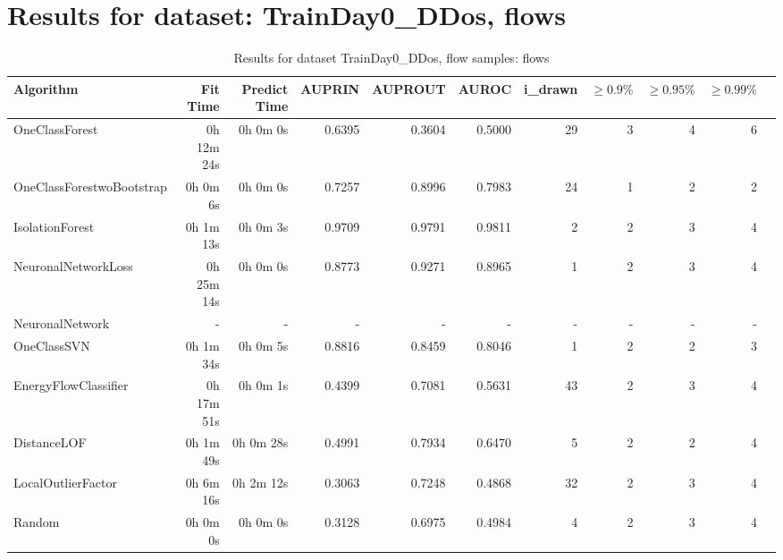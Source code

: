 \documentclass{article}
\begin{document}
\section*{Results for dataset: TrainDay0_DDos, flows}
\begin{table}[h!]
\centering
\caption{Results for dataset TrainDay0_DDos, flow samples: flows}
\begin{tabular}{lrrrrrrrrrr}
\toprule
Algorithm & Fit Time & Predict Time & AUPRIN & AUPROUT & AUROC & i\_drawn & $\geq 0.9\%$ & $\geq 0.95\%$ & $\geq 0.99\%$ \\
\midrule
OneClassForest & 0h 12m 24s & 0h 0m 0s & 0.6395 & 0.3604 & 0.5000 & 29 & 3 & 4 & 6 \\
OneClassForestwoBootstrap & 0h 0m 6s & 0h 0m 0s & 0.7257 & 0.8996 & 0.7983 & 24 & 1 & 2 & 2 \\
IsolationForest & 0h 1m 13s & 0h 0m 3s & 0.9709 & 0.9791 & 0.9811 & 2 & 2 & 3 & 4 \\
NeuronalNetworkLoss & 0h 25m 14s & 0h 0m 0s & 0.8773 & 0.9271 & 0.8965 & 1 & 2 & 3 & 4 \\
NeuronalNetwork & - & - & - & - & - & - & - & - & - \\
OneClassSVN & 0h 1m 34s & 0h 0m 5s & 0.8816 & 0.8459 & 0.8046 & 1 & 2 & 2 & 3 \\
EnergyFlowClassifier & 0h 17m 51s & 0h 0m 1s & 0.4399 & 0.7081 & 0.5631 & 43 & 2 & 3 & 4 \\
DistanceLOF & 0h 1m 49s & 0h 0m 28s & 0.4991 & 0.7934 & 0.6470 & 5 & 2 & 2 & 4 \\
LocalOutlierFactor & 0h 6m 16s & 0h 2m 12s & 0.3063 & 0.7248 & 0.4868 & 32 & 2 & 3 & 4 \\
Random & 0h 0m 0s & 0h 0m 0s & 0.3128 & 0.6975 & 0.4984 & 4 & 2 & 3 & 4 \\
\bottomrule
\end{tabular}
\end{table}
\end{document}
